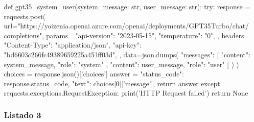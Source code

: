 \begin{APACode}
def gpt35_system_user(system_message: str, user_message: str):
    try:
        response = requests.post(
            url="https://yoizenia.openai.azure.com/openai/deployments/GPT35Turbo/chat/completions",
            params={
                "api-version": "2023-05-15",
                "temperature": "0",
            },
            headers={
                "Content-Type": "application/json",
                "api-key": "bd6603c266fc49389659225a451ff03d",
            },
            data=json.dumps({
                "messages": [
                    {
                        "content": system_message,
                        "role": "system"
                    },
                    {
                        "content": user_message,
                        "role": "user"
                    }
                ]
            })
        )
        choices = response.json()['choices']
        answer = {
            "status_code": response.status_code,
            "text": choices[0]['message'],
        }
        return answer
    except requests.exceptions.RequestException:
        print('HTTP Request failed')
        return None
\end{APACode}

\subsubsection{Listado 3}
\label{anexo:code-4-1-6-3}

